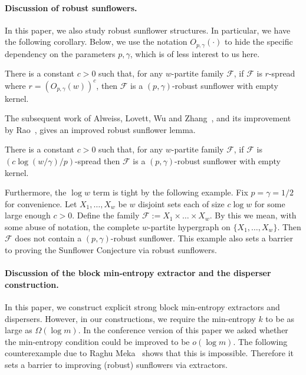 \documentclass{toc}
\newcommand{\calF}{\mathcal{F}} %
\begin{document}
\paragraph{Discussion of robust sunflowers.}
In this paper, we also study robust sunflower structures.
In particular, we have the following corollary. Below, we use
the notation $O_{p,\gamma}(\cdot)$ to hide the specific dependency
on the parameters $p,\gamma$, which is of less interest to us here.

\begin{corollary} There is a constant $c>0$ such that, for any
%
$w$-partite  %
family $\calF$, if $\calF$ is $r$-spread where
$r=(O_{p,\gamma} (w))^c$, then $\calF$ is a
$(p, \gamma)$-robust sunflower with empty kernel.
\end{corollary}

The subsequent work of Alweiss, Lovett, Wu and
Zhang~\cite{alweiss2020improved},  and its improvement by
Rao~\cite{rao2020coding},
gives an improved robust sunflower lemma.

\begin{lemma}  %
There is a constant $c>0$ such that, for any
$w$-partite family $\calF$,
if $\calF$ is $(c\log(w/\gamma)/p)$-spread then 
$\calF$ is a $(p, \gamma)$-robust sunflower with empty kernel.
\end{lemma}
Furthermore, the $\log w$ term is tight by the following example. Fix
$p=\gamma=1/2$ for convenience. Let $X_1,\dots,X_w$ be $w$ disjoint sets
each of size $c \log w$ for some large enough $c>0$. Define the family
$\calF:=X_{1}\times\dots\times X_w$.
%
%
%
%
By this we mean, with some abuse of notation,
the complete $w$-partite hypergraph on $\{X_1,\dots,X_w\}$.  %
Then $\calF$
does not contain a $(p, \gamma)$-robust sunflower. This example also
sets a barrier to proving 
the Sunflower Conjecture via robust sunflowers.

\paragraph{Discussion of the block min-entropy extractor and
the disperser construction.}

In this paper, we construct explicit strong block min-entropy extractors 
and dispersers. However, 
in our constructions, we require the min-entropy $k$ to be as large as $\Omega(\log m)$. In the conference version of this paper we asked whether the min-entropy condition could be improved to be $o(\log m)$. The following counterexample due to Raghu Meka~\cite{meka2018}
shows that this is impossible. Therefore it
sets a barrier to improving (robust) sunflowers via extractors.
\end{document}
